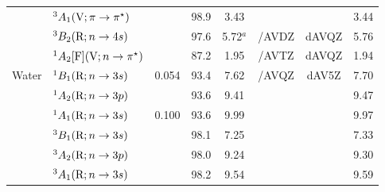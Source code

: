 \begin{tabular}{llcccccc}
                        &$^3A_1 (\mathrm{V};\pi \rightarrow \pi^\star)$				&		&98.9 & 3.43		&			&			&3.44	\\
                        &$^3B_2 (\mathrm{R};n \rightarrow 4s)$ 						&		&97.6 &5.72$^a$	&{\exCI}/AVDZ& dAVQZ		&5.76	\\
                        &$^1A_2 [\mathrm{F}] (\mathrm{V};n \rightarrow \pi^\star)$		&		&87.2 &1.95		&{\exCI}/AVTZ & dAVQZ		&1.94	\\
      Water		& $^1B_1 (\mathrm{R}; n \rightarrow 3s)$ 						& 0.054	&93.4 &7.62		& {\exCI}/AVQZ&dAV5Z 		&7.70	 \\
                        & $^1A_2 (\mathrm{R}; n \rightarrow 3p)$ 						& 		&93.6 &9.41		&			&			&9.47 	 \\	
                        & $^1A_1 (\mathrm{R}; n \rightarrow 3s)$ 						& 0.100	&93.6 &9.99		&			&			&9.97	 \\	
                        & $^3B_1 (\mathrm{R}; n \rightarrow 3s)$ 						& 		&98.1 &7.25		&			&			&7.33	 \\	
                        & $^3A_2 (\mathrm{R}; n \rightarrow 3p)$ 						& 		&98.0 &9.24 		&			&			&9.30	 \\	
                        & $^3A_1 (\mathrm{R}; n \rightarrow 3s)$ 						& 		&98.2 &9.54		&			&			&9.59	 \\	
       \end{tabular}